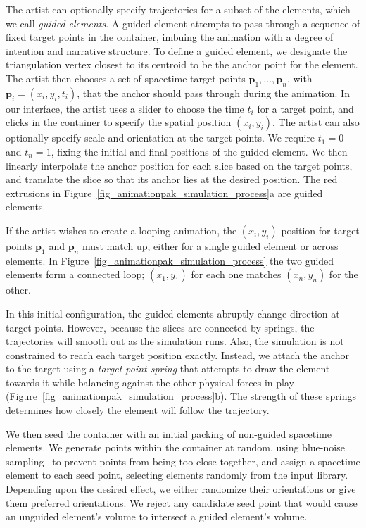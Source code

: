 The artist can optionally specify 
trajectories for a subset of the elements, which we call \textit{guided
elements}.  A guided element attempts to pass through a sequence
of fixed target points in the container,
imbuing the animation with a degree
of intention and narrative structure.  To define a guided element,
we designate the triangulation vertex closest to its centroid
to be the anchor point for the element.  The artist then
chooses a set of spacetime target points $\bm{p}_1,\ldots,\bm{p}_n$,
with $\bm{p}_i=(x_i,y_i,t_i)$, that the anchor should pass through
during the animation.
In our interface, the artist uses a slider to choose the time $t_i$ for 
a target point, and clicks in the container to specify the spatial
position $(x_i,y_i)$.
The artist can also optionally specify scale and
orientation at the target points. We require $t_1=0$ and $t_n=1$,
fixing the initial and final positions of the guided element.  
We then linearly interpolate the anchor position
for each slice based on the target points, and translate the slice
so that its anchor lies at the desired position.  The red extrusions
in Figure~\ref{fig_animationpak_simulation_process}a are guided elements.

If the artist wishes to create a looping animation, the $(x_i,y_i)$ position
for target points $\bm{p}_1$ and $\bm{p}_n$ must match up, either
for a single guided element or across elements. In
Figure~\ref{fig_animationpak_simulation_process} the two guided elements form a connected
loop; $(x_1,y_1)$ for each one matches $(x_n,y_n)$ for the other.

In this initial configuration, the guided elements abruptly change
direction at target points.  However, because the slices are connected
by springs, the trajectories will smooth out as the 
simulation runs. Also, the simulation is not constrained to reach
each target position exactly.  Instead, we attach the
anchor to the target using a \textit{target-point spring} that
attempts to draw the element towards it while balancing against
the other physical forces in play (Figure~\ref{fig_animationpak_simulation_process}b).
The strength of these springs determines how closely the element
will follow the trajectory.

We then seed the container with an initial packing of non-guided
spacetime elements.  We generate points within the container at random, 
using blue-noise sampling~\cite{Bridson2007}
to prevent points from being too close together,
and assign a spacetime element to
each seed point, selecting elements randomly from the input library.
Depending upon the desired effect, we either randomize their orientations
or give them preferred orientations.  We reject any candidate seed point
that would cause an unguided element's volume to intersect a guided element's
volume.

